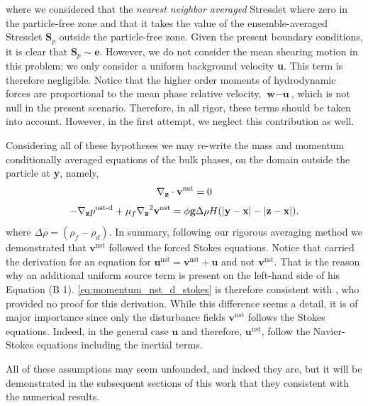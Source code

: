 where we considered that the \textit{nearest neighbor averaged} Stresslet where zero in the particle-free zone and that it takes the value of the ensemble-averaged Stresslet $\textbf{S}_p$ outside the particle-free zone.
Given the present boundary conditions, it is clear that $\textbf{S}_p \sim \textbf{e}$.
However, we do not consider the mean shearing motion in this problem; we only consider a uniform background velocity \textbf{u}. 
This term is therefore negligible. 
Notice that the higher order moments of hydrodynamic forces are proportional to the mean phase relative velocity, $\textbf{w} - \textbf{u}$, which is not null in the present scenario. 
Therefore, in all rigor, these terms should be taken into account.
However, in the first attempt, we neglect this contribution as well. 

Considering all of these hypotheses we may re-write the mass and momentum conditionally averaged equations of the bulk phases, on the domain outside the particle at \textbf{y}, namely,
\begin{equation}
    \pddz \cdot \textbf{v}^\text{nst}
    = 0
    \label{eq:mass_nst_d_stokes}
\end{equation}
\begin{equation}
    - \pddz p^\text{nst-d} 
    + \mu_f \pddz^2 \textbf{v}^\text{nst}
    = 
    \phi
    \textbf{g}
    \Delta\rho H(|\textbf{y} - \textbf{x}| - |\textbf{z} - \textbf{x}|). 
    \label{eq:momentum_nst_d_stokes}
\end{equation}
where $\Delta \rho = (\rho_f - \rho_d)$. 
In summary, following our rigorous averaging method we demonstrated that $\textbf{v}^\text{nst}$ followed the forced Stokes equations. 
Notice that \citet{zhang2021ensemble} carried the derivation for an equation for $\textbf{u}^\text{nst} = \textbf{v}^\text{nst} + \textbf{u}$ and not $\textbf{v}^\text{nst}$. 
That is the reason why an additional uniform source term is present on the left-hand side of his Equation (B 1). 
\ref{eq:momentum_nst_d_stokes} is therefore consistent with \citet{zhang2021ensemble}, who provided no proof for this derivation. 
While this difference seems a detail, it is of major importance since only the disturbance fields $\textbf{v}^\text{nst}$ follows the Stokes equations.
Indeed, in the general case $\textbf{u}$ and therefore, $\textbf{u}^\text{nst}$, follow the Navier-Stokes equations including the inertial terms. 



All of these assumptions may seem unfounded, and indeed they are, but it will be demonstrated in the subsequent sections of this work that they consistent with the numerical results. 



